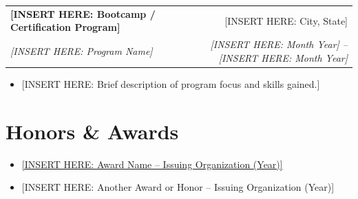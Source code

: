 \documentclass[letterpaper,10pt]{article}
\makeatletter
\newcommand{\resumeHeading}[4]{
    \begin{tabular*}{0.99\textwidth}[t]{l@{\extracolsep{\fill}}r}
      \textbf{#1} & #2 \\
      \textit{\small#3} & \textit{\small #4} \\
    \end{tabular*}\vspace{-5pt}
}
\newcommand{\resumeItemListStart}{\begin{itemize}}
\newcommand{\resumeItemListEnd}{\end{itemize}\vspace{-5pt}}
\makeatother
\begin{document}
  \vspace{5pt}

  \resumeHeading
    {[INSERT HERE: Bootcamp / Certification Program]}{[INSERT HERE: City, State]}
    {[INSERT HERE: Program Name]}{[INSERT HERE: Month Year] -- [INSERT HERE: Month Year]}
  \resumeItemListStart
    \vspace{2pt}
    \item\small{[INSERT HERE: Brief description of program focus and skills gained.]}
    \vspace{-4pt}
  \resumeItemListEnd

\vspace{-5pt}
\section{Honors \& Awards}
\resumeItemListStart
  \item\small{\href{https://[INSERT HERE: awardurl.com]}{[INSERT HERE: Award Name -- Issuing Organization (Year)]}}
  \vspace{-5pt}
  \item\small{[INSERT HERE: Another Award or Honor -- Issuing Organization (Year)]}
  \vspace{-5pt}
\resumeItemListEnd

\end{document}
